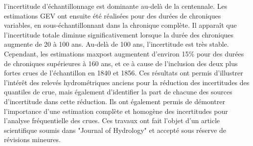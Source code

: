 l'incertitude d'échantillonnage est dominante au-delà de la centennale. Les estimations GEV ont ensuite été réalisées pour des durées de chroniques variables, en sous-échantillonnant dans la chronique complète. Il apparaît que l'incertitude totale diminue significativement lorsque la durée des chroniques augmente de 20 à 100 ans. Au-delà de 100 ans, l'incertitude est très stable. Cependant, les estimations maxpost augmentent d'environ 15\% pour des durées de chroniques supérieures à 160 ans, et ce à cause de l'inclusion des deux plus fortes crues de l'échantillon en 1840 et 1856. Ces résultats ont permis d'illustrer l'intérêt des relevés hydrométriques anciens pour la réduction des incertitudes des quantiles de crue, mais également d'identifier la part de chacune des sources d'incertitude dans cette réduction. Ils ont également permis de démontrer l'importance d'une estimation complète et homogène des incertitudes pour l'analyse fréquentielle des crues. Ces travaux ont fait l'objet d'un article scientifique soumis dans "Journal of Hydrology" et accepté sous réserve de révisions mineures.
	
